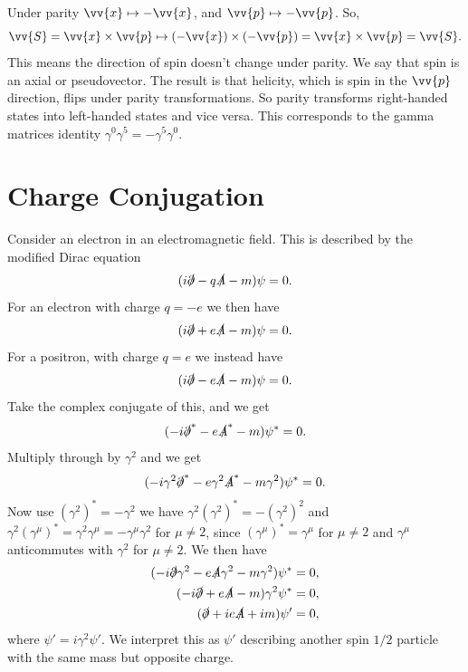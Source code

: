 \documentclass[fleqn]{NotesClass}
\begin{document}
    Under parity \(\vv{x} \mapsto -\vv{x}\), and \(\vv{p} \mapsto -\vv{p}\).
    So,
    \begin{equation}
        \vv{S} = \vv{x} \times \vv{p} \mapsto (-\vv{x}) \times (-\vv{p}) = \vv{x} \times \vv{p} = \vv{S}.
    \end{equation}
    This means the direction of spin doesn't change under parity.
    We say that spin is an axial or pseudovector.
    The result is that helicity, which is spin in the \(\vv{p}\) direction, flips under parity transformations.
    So parity transforms right-handed states into left-handed states and vice versa.
    This corresponds to the gamma matrices identity \(\gamma^0\gamma^5 = -\gamma^5\gamma^0\).
    
    \section{Charge Conjugation}
    Consider an electron in an electromagnetic field.
    This is described by the modified Dirac equation
    \begin{equation}
        (i\slashed{\partial} - q\slashed{A} - m)\psi = 0.
    \end{equation}
    For an electron with charge \(q = -e\) we then have
    \begin{equation}
        (i\slashed{\partial} + e\slashed{A} - m)\psi = 0.
    \end{equation}
    For a positron, with charge \(q = e\) we instead have
    \begin{equation}
        (i\slashed{\partial} - e\slashed{A} - m)\psi = 0.
    \end{equation}
    Take the complex conjugate of this, and we get
    \begin{equation}
        (-i\slashed{\partial}^* - e\slashed{A}^* - m)\psi^* = 0.
    \end{equation}
    Multiply through by \(\gamma^2\) and we get
    \begin{equation}
        (-i\gamma^2\slashed{\partial}^* - e\gamma^2\slashed{A}^* - m\gamma^2)\psi^* = 0.
    \end{equation}
    Now use \((\gamma^2)^* = -\gamma^2\) we have \(\gamma^2(\gamma^2)^* = -(\gamma^2)^2\) and \(\gamma^2(\gamma^\mu)^* = \gamma^2\gamma^\mu = -\gamma^\mu\gamma^2\) for \(\mu \ne 2\), since \((\gamma^\mu)^* = \gamma^\mu\) for \(\mu \ne 2\) and \(\gamma^\mu\) anticommutes with \(\gamma^2\) for \(\mu \ne 2\).
    We then have
    \begin{align}
        (-i\slashed{\partial}\gamma^2 - e\slashed{A}\gamma^2 - m\gamma^2)\psi^* &= 0,\\
        (-i\slashed{\partial} + e\slashed{A} - m)\gamma^2\psi^* &= 0,\\
        (\slashed{\partial} + ie\slashed{A} + im)\psi' &= 0,
    \end{align}
    where \(\psi' = i\gamma^2\psi'\).
    We interpret this as \(\psi'\) describing another spin \(1/2\) particle with the same mass but opposite charge.
    
\end{document}
